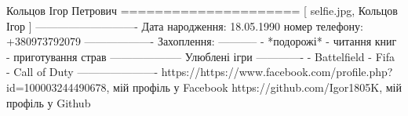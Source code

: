 Кольцов Ігор Петрович
=====================
[ selfie.jpg, Кольцов Ігор ]
----------------------------
Дата народження: 18.05.1990
номер телефону: +380973792079
-------------------
Захоплення: 
-----------
- *подорожі*
- читання книг 
- приготування страв
--------------------
Улюблені ігри
-------------
- Battelfield
- Fifa
- Call of Duty
----------------------
{ https://https://www.facebook.com/profile.php?id=100003244490678, мій профіль у Facebook }
{ https://github.com/Igor1805K, мій профіль у Github }